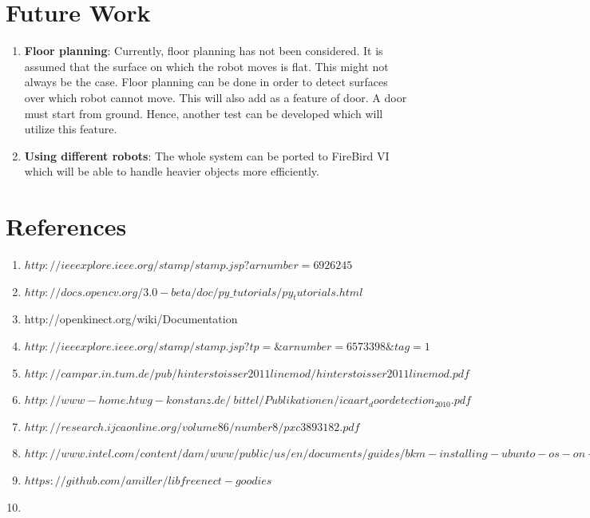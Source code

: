 \documentclass{report}
\begin{document}
\chapter{Future Work}

\begin{enumerate}
 \item \textbf{Floor planning}: Currently, floor planning has not been considered. It is assumed that the surface on which the
 robot moves is flat. This might not always be the case. Floor planning can be done in order to detect surfaces over which robot
 cannot move. This will also add as a feature of door. A door must start from ground. Hence, another test can be developed
 which will utilize this feature.
 
 \item \textbf{Using different robots}: The whole system can be ported to FireBird VI which will be able to handle heavier objects more efficiently.
\end{enumerate}

\chapter{References}
\begin{enumerate}
 \item $http://ieeexplore.ieee.org/stamp/stamp.jsp?arnumber=6926245$
 \item $http://docs.opencv.org/3.0-beta/doc/py\_tutorials/py_tutorials.html$
 \item http://openkinect.org/wiki/Documentation
 \item $http://ieeexplore.ieee.org/stamp/stamp.jsp?tp=\&arnumber=6573398\&tag=1$
 \item $http://campar.in.tum.de/pub/hinterstoisser2011linemod/hinterstoisser2011linemod.pdf$
 \item $http://www-home.htwg-konstanz.de/~bittel/Publikationen/icaart_doordetection_2010.pdf$
 \item $http://research.ijcaonline.org/volume86/number8/pxc3893182.pdf$
 \item $http://www.intel.com/content/dam/www/public/us/en/documents/guides/bkm-installing-ubunto-os-on-de2i-150-board-guide.pdf$
 \item $https://github.com/amiller/libfreenect-goodies$
 \item 
\end{enumerate}
 
\end{document}
